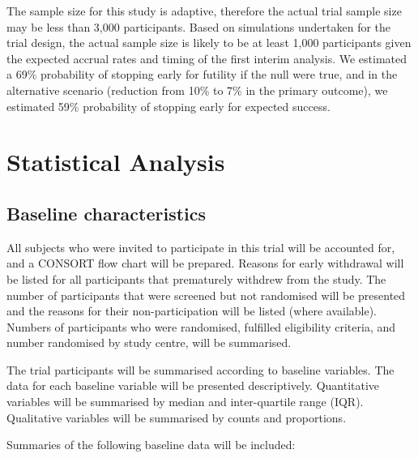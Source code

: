 \documentclass{bmcart}
\begin{document}
The sample size for this study is adaptive, therefore the actual trial sample size may be less than 3,000 participants. Based on simulations undertaken for the trial design, the actual sample size is likely to be at least 1,000 participants given the expected accrual rates and timing of the first interim analysis.
We estimated a 69\% probability of stopping early for futility if the null were true, and in the alternative scenario (reduction from 10\% to 7\% in the primary outcome), we estimated 59\% probability of stopping early for expected success.

\section*{Statistical Analysis}

\subsection*{Baseline characteristics}

All subjects who were invited to participate in this trial will be accounted for, and a CONSORT flow chart will be prepared.
Reasons for early withdrawal will be listed for all participants that prematurely withdrew from the study.
The number of participants that were screened but not randomised will be presented and the reasons for their non-participation will be listed (where available).
Numbers of participants who were randomised, fulfilled eligibility criteria, and number randomised by study centre, will be summarised.

The trial participants will be summarised according to baseline variables.
The data for each baseline variable will be presented descriptively.
Quantitative variables will be summarised by median and inter-quartile range (IQR).
Qualitative variables will be summarised by counts and proportions.

Summaries of the following baseline data will be included:
\end{document}
